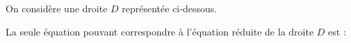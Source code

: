 
On considère une droite $D$ représentée ci-dessous.

\begin{Centrage}
  \begin{GraphiqueTikz}[x=0.35cm,y=0.35cm,Xmin=-1.2,Xmax=3.6,Ymin=-1.7,Ymax=2]
    \TracerAxesGrilles[Origine,Grille=false]{}{}
  \end{GraphiqueTikz}
\end{Centrage}

La seule équation pouvant correspondre à l'équation réduite de la droite $D$ est :

\smallskip

